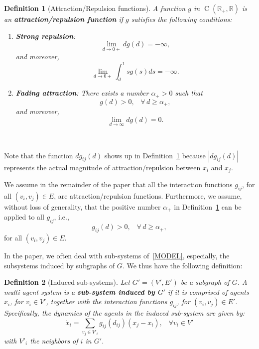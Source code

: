 \documentclass[10pt,twocolumn,twoside]{IEEEtran}
\newtheorem{Definition}{Definition}
\newcommand{\R}{\mathbb{R}}
\renewcommand{\(}{\left (}
\renewcommand{\)}{\right )}
\renewcommand{\;}{\,;\,}
\begin{document}
\begin{Definition}[Attraction/Repulsion functions]\label{def:fadingattraction}
A function $g$ in $\operatorname{C}(\R_+,\R)$ is an {\bf attraction/repulsion function} if $g$ satisfies the following conditions: 
\begin{enumerate}
\item {\bf Strong repulsion}: $$\lim_{d\to 0+} dg(d)=-\infty,$$ 
and moreover,  $$\displaystyle \lim_{d\to 0+}\int^1_d sg(s)ds=-\infty.$$ 
\item {\bf Fading attraction}: There exists a number $\alpha_+ > 0$ such that 
\begin{equation*}
g(d) > 0, \hspace{10pt} \forall \, d \ge \alpha_+,    
\end{equation*} and moreover,  $$\lim_{d\to\infty} d g(d)=0.$$   
\end{enumerate}\,
\end{Definition}

\noindent Note that the function $dg_{ij}(d)$ shows up in Definition~\ref{def:fadingattraction} because $| dg_{ij}(d) |$ represents the actual magnitude of attraction/repulsion between $x_i$ and $x_j$. 

 We assume in the remainder of the paper that all the interaction functions $g_{ij}$, for all $(v_i,v_j) \in E$, are attraction/repulsion functions. Furthermore, we assume, without loss of generality, that the positive number $\alpha_+$ in Definition~\ref{def:fadingattraction} can be applied to all $g_{ij}$, i.e., 
 \begin{equation}\label{eq:defx+}
g_{ij}(d) > 0, \hspace{10pt} \forall \, d \ge \alpha_+,   
 \end{equation}
 for all $(v_i,v_j) \in E$. 
 
In the paper, we often deal with sub-systems of~\eqref{MODEL}, especially, the subsystems induced by subgraphs of $G$. We thus have the following definition: 




\begin{Definition}[Induced sub-systems]
Let $G' = (V',E')$ be a subgraph of $G$. A multi-agent system is a  {\bf sub-system induced by $G'$}  if it is comprised of  agents $ x_i$, for $v_i\in V'$,  together with the interaction functions   $g_{ij}$,  for $(v_i,v_j)\in E'$. Specifically,  the dynamics of the agents in the induced sub-system are given by:
\begin{equation*}\label{eq:inducedsub-system}
\dot{ x}_{i} = \sum_{v_j\in V'_i}g_{ij}(d_{ij}) ( x_j- x_i),\hspace{10pt} \forall v_i\in V'
\end{equation*}
with $V'_i$ the neighbors of $i$ in $G'$. \end{Definition}
\end{document}
